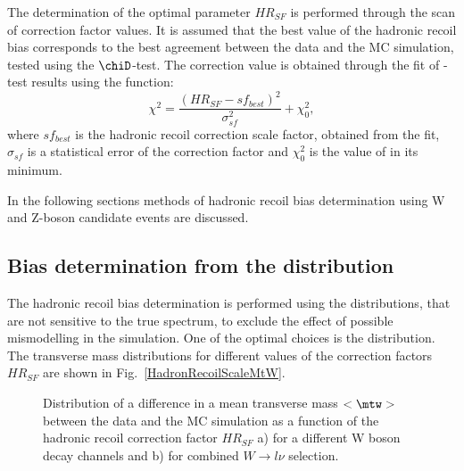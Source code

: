 The determination of the optimal parameter $HR_{SF}$ is performed through the scan of correction factor values. It is assumed that the best value of the hadronic recoil bias corresponds to the best agreement between the data and the MC simulation, tested using the $\chiD$-test. The correction value is obtained through the \chiD fit of \chiD-test results using the function:
\begin{equation}\label{eq:chiD}
\chi^2 = \frac{(HR_{SF}-sf_{best})^2}{\sigma_{sf}^2}+\chi^2_0,
\end{equation}
where $sf_{best}$ is the hadronic recoil correction scale factor, obtained from the \chiD fit,  $\sigma_{sf}$ is a statistical error of the correction factor and $\chi^2_0$ is the value of \chiD in its minimum. 

In the following sections methods of hadronic recoil bias determination using W and Z-boson candidate events are discussed.

\subsection{Bias determination from the \mtw distribution}


The hadronic recoil bias determination is performed using the distributions, that  are not sensitive to the true \ptw spectrum, to exclude the effect of possible \ptw mismodelling in the simulation.  One of the optimal choices is the \mtw distribution. The transverse mass distributions for different values of the correction factors $HR_{SF}$ are shown in Fig.~\ref{HadronRecoilScaleMtW}. 

\begin{figure}[!tbp]
\begin{minipage}[h]{0.49\linewidth}
\end{minipage}
\hfill
\begin{minipage}[h]{0.49\linewidth}
\end{minipage}
\caption{Distribution of a difference in a mean transverse mass $<\mtw>$ between the data and the MC simulation as a function of the hadronic recoil correction factor $HR_{SF}$ a) for a different W boson decay channels and b) for combined $W \to l \nu$ selection.}
\label{fig:HRBiasMean}
\end{figure}


